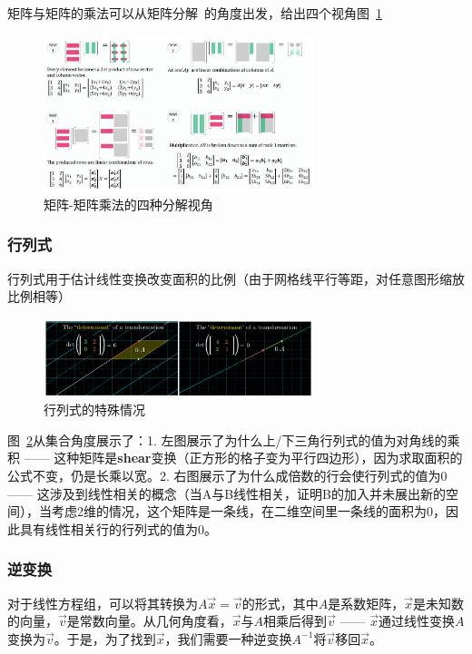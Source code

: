 \documentclass[UTF8]{ctexart}
\begin{document}
矩阵与矩阵的乘法可以从矩阵分解~\cite{Artoflinearalgebra}的角度出发，给出四个视角图~\ref{fig:4_vies_m_multication}

\begin{figure}[hb]
    \centering
    \includegraphics[width=0.7\textwidth]{./figs/4sight_m_multication.png}
    \caption{矩阵-矩阵乘法的四种分解视角}
    \label{fig:4_vies_m_multication}
\end{figure}

\subsubsection{行列式}

行列式用于估计线性变换改变面积的比例（由于网格线平行等距，对任意图形缩放比例相等）

\begin{figure}[hb]
    \centering
    \includegraphics[width=0.7\textwidth]{./figs/det_special.png}
    \caption{行列式的特殊情况}
    \label{fig:det_special}
\end{figure}

图~\ref{fig:det_special}从集合角度展示了：1. 左图展示了为什么上/下三角行列式的值为对角线的乘积 —— 这种矩阵是\textbf{shear}变换（正方形的格子变为平行四边形），因为求取面积的公式不变，仍是长乘以宽。2. 右图展示了为什么成倍数的行会使行列式的值为0 —— 这涉及到线性相关的概念（当A与B线性相关，证明B的加入并未展出新的空间），当考虑2维的情况，这个矩阵是一条线，在二维空间里一条线的面积为0，因此具有线性相关行的行列式的值为0。

\subsubsection{逆变换}
对于线性方程组，可以将其转换为$A\vec{x}=\vec{v}$的形式，其中$A$是系数矩阵，$\vec{x}$是未知数的向量，$\vec{v}$是常数向量。从几何角度看，$\vec{x}$与$A$相乘后得到$\vec{v}$ —— $\vec{x}$通过线性变换$A$变换为$\vec{v}$。于是，为了找到$\vec{x}$，我们需要一种逆变换$A^{-1}$将$\vec{v}$移回$\vec{x}$。
\end{document}
